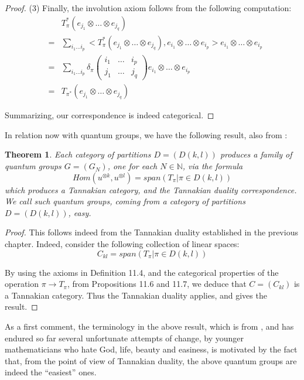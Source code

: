 \documentclass[12pt]{amsbook}
\newtheorem{theorem}{Theorem}[chapter]
\begin{document}
\begin{proof}
(3) Finally, the involution axiom follows from the following computation:
\begin{eqnarray*}
&&T_\pi^*(e_{j_1}\otimes\ldots\otimes e_{j_q})\\
&=&\sum_{i_1\ldots i_p}<T_\pi^*(e_{j_1}\otimes\ldots\otimes e_{j_q}),e_{i_1}\otimes\ldots\otimes e_{i_p}>e_{i_1}\otimes\ldots\otimes e_{i_p}\\
&=&\sum_{i_1\ldots i_p}\delta_\pi\begin{pmatrix}i_1&\ldots&i_p\\ j_1&\ldots& j_q\end{pmatrix}e_{i_1}\otimes\ldots\otimes e_{i_p}\\
&=&T_{\pi^*}(e_{j_1}\otimes\ldots\otimes e_{j_q})
\end{eqnarray*}

Summarizing, our correspondence is indeed categorical.
\end{proof}

In relation now with quantum groups, we have the following result, also from \cite{bsp}:


\begin{theorem}
Each category of partitions $D=(D(k,l))$ produces a family of quantum groups $G=(G_N)$, one for each $N\in\mathbb N$, via the formula
$$Hom(u^{\otimes k},u^{\otimes l})=span\left(T_\pi\Big|\pi\in D(k,l)\right)$$
which produces a Tannakian category, and the Tannakian duality correspondence. We call such quantum groups, coming from a category of partitions $D=(D(k,l))$, easy.
\end{theorem}

\begin{proof}
This follows indeed from the Tannakian duality established in the previous chapter. Indeed, consider the following collection of linear spaces:
$$C_{kl}=span\left(T_\pi\Big|\pi\in D(k,l)\right)$$

By using the axioms in Definition 11.4, and the categorical properties of the operation $\pi\to T_\pi$, from Propositions 11.6 and 11.7, we deduce that $C=(C_{kl})$ is a Tannakian category. Thus the Tannakian duality applies, and gives the result.
\end{proof}

As a first comment, the terminology in the above result, which is from \cite{bsp}, and has endured so far several unfortunate attempts of change, by younger mathematicians who hate God, life,  beauty and easiness, is motivated by the fact that, from the point of view of Tannakian duality, the above quantum groups are indeed the ``easiest'' ones. 
\end{document}
